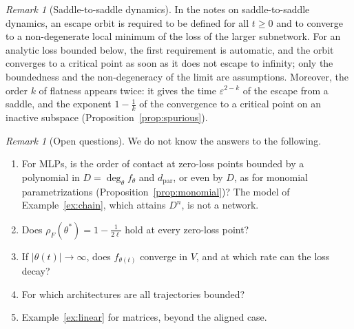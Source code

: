 \documentclass[11pt]{article}
\theoremstyle{definition}
\theoremstyle{remark}
\newtheorem{remark}[lemma]{Remark}
\newcommand{\dpar}{d_{\mathrm{par}}}
\begin{document}
\begin{remark}[Saddle-to-saddle dynamics]
In the notes on saddle-to-saddle dynamics, an escape orbit is required to be defined for all $t\ge0$ and to converge to a non-degenerate local minimum of the loss of the larger subnetwork. For an analytic loss bounded below, the first requirement is automatic, and the orbit converges to a critical point as soon as it does not escape to infinity; only the boundedness and the non-degeneracy of the limit are assumptions. Moreover, the order $k$ of flatness appears twice: it gives the time $\varepsilon^{2-k}$ of the escape from a saddle, and the exponent $1-\frac1k$ of the convergence to a critical point on an inactive subspace (Proposition~\ref{prop:spurious}).
\end{remark}

\begin{remark}[Open questions]\label{rem:open}
We do not know the answers to the following.
\begin{enumerate}[label=\textup{(\arabic*)},nosep,leftmargin=2.6em]
\item For MLPs, is the order of contact at zero-loss points bounded by a polynomial in $D=\deg_\theta f_\theta$ and $\dpar$, or even by $D$, as for monomial parametrizations (Proposition~\ref{prop:monomial})? The model of Example~\ref{ex:chain}, which attains $D^n$, is not a network.
\item Does $\rho_F(\theta^*)=1-\frac1{2\ell}$ hold at every zero-loss point?
\item If $|\theta(t)|\to\infty$, does $f_{\theta(t)}$ converge in $V$, and at which rate can the loss decay?
\item For which architectures are all trajectories bounded?
\item Example~\ref{ex:linear} for matrices, beyond the aligned case.
\end{enumerate}
\end{remark}
\end{document}
